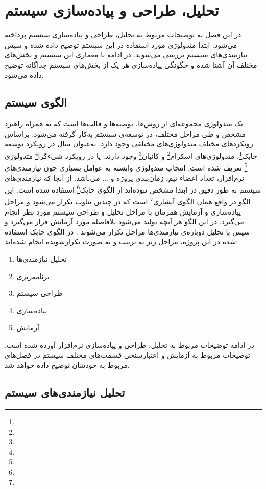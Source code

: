 \chapter{تحلیل، طراحی و پیاده‌سازی سیستم}
در این فصل به توضیحات مربوط به تحلیل، طراحی و پیاده‌سازی سیستم پرداخته می‌شود. ابتدا متدولوژی مورد استفاده در این سیستم توضیح داده شده و سپس نیازمندی‌های سیستم بررسی می‌شوند. در ادامه با معماری این سیستم و بخش‌های مختلف آن آشنا شده و چگونگی پیاده‌سازی هر یک از بخش‌های سیستم جداگانه توضیح داده می‌شود.

\section{الگوی سیستم}
یک متدولوژی مجموعه‌ای از روش‌ها، توصیه‌ها و قالب‌ها است که به همراه راهبرد مشخص و طی مراحل مختلف، در توسعه‌ی سیستم به‌کار گرفته می‌شود. براساس رویکرد‌های مختلف متدولوژی‌های مختلفی وجود دارد. به‌عنوان مثال در رویکرد توسعه چابک\footnote{}، متدولوژی‌های اسکرام\footnote{} و کانبان\footnote{} وجود دارند. یا در رویکرد شیءگرا\footnote{} متدولوژی \footnote{} تعریف شده است. انتخاب متدولوژی وابسته به عوامل بسیاری چون نیازمندی‌های نرم‌افزار، تعداد اعضاء تیم، زمان‌بندی پروژه و ... می‌باشد. 
از آنجا که نیازمندی‌های سیستم به طور دقیق در ابتدا مشخص نبوده‌اند از الگوی چابک\footnote{} استفاده شده است. این الگو در واقع همان الگوی آبشاری\footnote{} است که در چندین تناوب تکرار می‌شود و ‌مراحل پیاده‌سازی و آزمایش همزمان با مراحل تحلیل و طراحی سیستم مورد نظر انجام می‌گیرد. در این الگو هر آنچه تولید می‌شود بلافاصله مورد آزمایش قرار می‌گیرد و سپس با تحلیل دوباره‌ی نیازمندی‌ها مراحل تکرار می‌شوند \cite{pressman2019software}. در الگوی چابک استفاده شده در این پروژه، مراحل زیر به ترتیب و به صورت تکرارشونده انجام شده‌اند:
\begin{enumerate}
	\item تحلیل نیازمندی‌ها
	\item برنامه‌ریزی
	\item طراحی سیستم
	\item پیاده‌سازی
	\item آزمایش‌
\end{enumerate}

در ادامه توضیحات مربوط به تحلیل، طراحی و پیاده‌سازی نرم‌افزار آورده شده‌ است. توضیحات مربوط به آزمایش و اعتبارسنجی قسمت‌های مختلف سیستم در فصل‌های مربوط به خودشان توضیح داده خواهد شد.

\section{تحلیل نیازمندی‌های سیستم}

